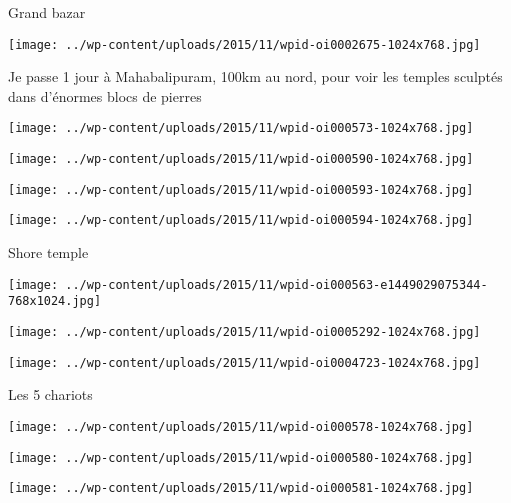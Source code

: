  \newline
 Grand bazar \newline
 \newline
\centerline{\texttt{[image: ../wp-content/uploads/2015/11/wpid-oi0002675-1024x768.jpg]} } 
 \newline
 Je passe 1 jour à Mahabalipuram, 100km au nord, pour voir les temples sculptés dans d'énormes blocs de pierres \newline
 \newline
\centerline{\texttt{[image: ../wp-content/uploads/2015/11/wpid-oi000573-1024x768.jpg]} } 
 \newline
 \newline
\centerline{\texttt{[image: ../wp-content/uploads/2015/11/wpid-oi000590-1024x768.jpg]} } 
 \newline
 \newline
\centerline{\texttt{[image: ../wp-content/uploads/2015/11/wpid-oi000593-1024x768.jpg]} } 
 \newline
 \newline
\centerline{\texttt{[image: ../wp-content/uploads/2015/11/wpid-oi000594-1024x768.jpg]} } 
 \newline
 Shore temple \newline
 \newline
\centerline{\texttt{[image: ../wp-content/uploads/2015/11/wpid-oi000563-e1449029075344-768x1024.jpg]} } 
 \newline
 \newline
\centerline{\texttt{[image: ../wp-content/uploads/2015/11/wpid-oi0005292-1024x768.jpg]} } 
 \newline
 \newline
\centerline{\texttt{[image: ../wp-content/uploads/2015/11/wpid-oi0004723-1024x768.jpg]} } 
 \newline
 Les 5 chariots \newline
 \newline
\centerline{\texttt{[image: ../wp-content/uploads/2015/11/wpid-oi000578-1024x768.jpg]} } 
 \newline
 \newline
\centerline{\texttt{[image: ../wp-content/uploads/2015/11/wpid-oi000580-1024x768.jpg]} } 
 \newline
 \newline
\centerline{\texttt{[image: ../wp-content/uploads/2015/11/wpid-oi000581-1024x768.jpg]} } 
